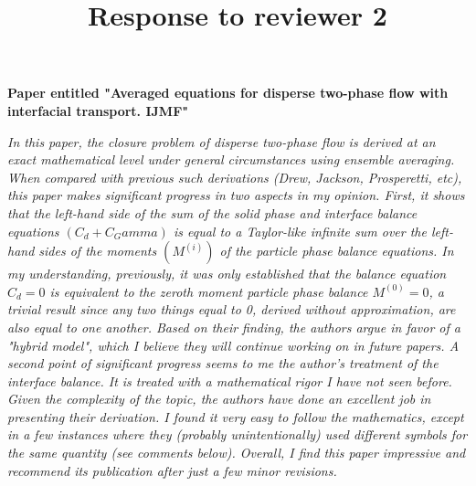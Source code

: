 \documentclass[10pt,a4paper]{article}
\begin{document}
\title{Response to reviewer 2} 
\maketitle
\textbf{Paper entitled "Averaged equations for disperse two-phase flow with interfacial transport. IJMF"}
\bigskip



\textit{In this paper, the closure problem of disperse two-phase flow is derived at an exact mathematical level under general circumstances using ensemble averaging. When compared with previous such derivations (Drew, Jackson, Prosperetti, etc), this paper makes significant progress in two aspects in my opinion. First, it shows that the left-hand side of the sum of the solid phase and interface balance equations $(C_d+C_Gamma)$ is equal to a Taylor-like infinite sum over the left-hand sides of the moments $(M^(i))$ of the particle phase balance equations. In my understanding, previously, it was only established that the balance equation $C_d =0$ is equivalent to the zeroth moment particle phase balance $M^(0)=0$, a trivial result since any two things equal to 0, derived without approximation, are also equal to one another. Based on their finding, the authors argue in favor of a "hybrid model", which I believe they will continue working on in future papers. A second point of significant progress seems to me the author's treatment of the interface balance. It is treated with a mathematical rigor I have not seen before.
Given the complexity of the topic, the authors have done an excellent job in presenting their derivation. I found it very easy to follow the mathematics, except in a few instances where they (probably unintentionally) used different symbols for the same quantity (see comments below). Overall, I find this paper impressive and recommend its publication after just a few minor revisions.}
\end{document}
